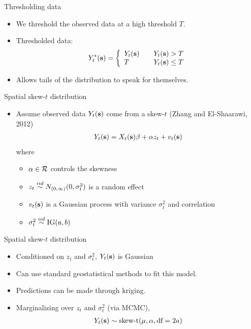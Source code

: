 \documentclass{beamer}
\begin{document}
\begin{frame}{Thresholding data}
  \begin{itemize} \setlength{\itemsep}{0.5em}
    \item We threshold the observed data at a high threshold $T$.
    \item Thresholded data:
    \begin{align*}
      Y_t^*(\mbox{\bf s}) = \left\{ \begin{array}{ll}
          Y_t(\mbox{\bf s}) \quad & Y_t(\mbox{\bf s}) > T\\
          T \quad & Y_t(\mbox{\bf s}) \le T
      \end{array}\right.
    \end{align*}
    \item Allows tails of the distribution to speak for themselves.
  \end{itemize}
\end{frame}

\begin{frame}{Spatial skew-$t$ distribution}
  \begin{itemize} \setlength{\itemsep}{0.5em}
    \item Assume observed data $Y_t(\mbox{\bf s})$ come from a skew-$t$ (Zhang and El-Shaarawi, 2012)
    \begin{align*}
      Y_t(\mbox{\bf s}) = X_t(\mbox{\bf s})\beta + \alpha z_t + v_t(\mbox{\bf s})
    \end{align*}
    where
    \begin{itemize} \setlength{\itemsep}{0.25em}
      \item $\alpha \in {\cal R}$ controls the skewness
      \item $z_t \stackrel{iid}{\sim} N_{(0, \infty)}(0, \sigma^2_t)$ is a random effect
      \item $v_t(\mbox{\bf s})$ is a Gaussian process with variance $\sigma^2_t$ and \Matern correlation
      \item $\sigma_t^2 \stackrel{iid}{\sim} \text{IG}(a, b)$
    \end{itemize}
  \end{itemize}
\end{frame}

\begin{frame}{Spatial skew-$t$ distribution}
  \begin{itemize} \setlength{\itemsep}{0.5em}
    \item \alert{Conditioned} on $z_t$ and $\sigma^2_t$, $Y_t(\mbox{\bf s})$ is Gaussian
    \item Can use standard geostatistical methods to fit this model.
    \item Predictions can be made through kriging.
    \item \alert{Marginalizing} over $z_t$ and $\sigma^2_t$ (via MCMC),
    \begin{align*}
      Y_t(\mbox{\bf s}) \sim \text{skew-t}(\mu, \alpha, \text{df}=2a)
    \end{align*}
  \end{itemize}
\end{frame}
\end{document}
